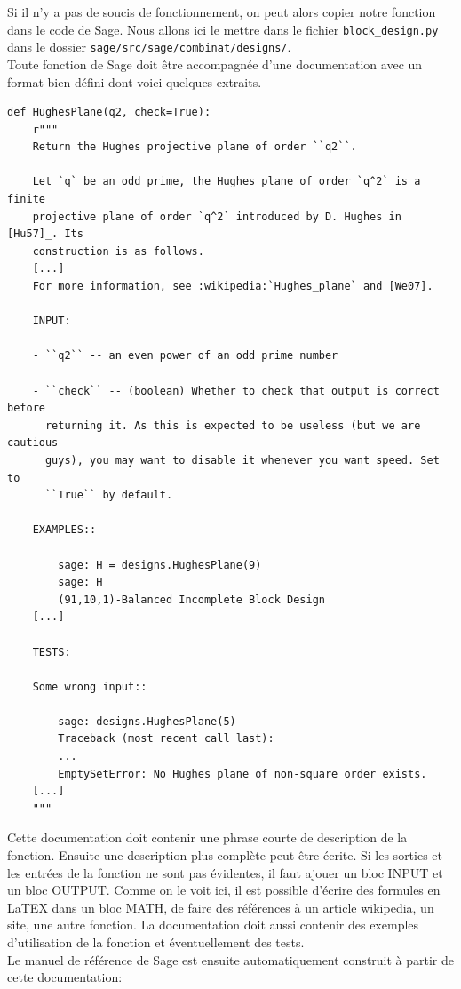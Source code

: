\documentclass[a4paper]{article}
\begin{document}
\medskip
Si il n'y a pas de soucis de fonctionnement, on peut alors copier notre fonction dans le code de Sage. Nous allons ici le mettre dans le fichier \texttt{block\_design.py} dans le dossier \texttt{sage/src/sage/combinat/designs/}.\medskip\\
Toute fonction de Sage doit être accompagnée d'une documentation avec un format bien défini dont voici quelques extraits.\\
\begin{lstlisting}
def HughesPlane(q2, check=True):
    r"""
    Return the Hughes projective plane of order ``q2``.

    Let `q` be an odd prime, the Hughes plane of order `q^2` is a finite
    projective plane of order `q^2` introduced by D. Hughes in [Hu57]_. Its
    construction is as follows.
    [...]
    For more information, see :wikipedia:`Hughes_plane` and [We07].

    INPUT:

    - ``q2`` -- an even power of an odd prime number

    - ``check`` -- (boolean) Whether to check that output is correct before
      returning it. As this is expected to be useless (but we are cautious
      guys), you may want to disable it whenever you want speed. Set to
      ``True`` by default.

    EXAMPLES::

        sage: H = designs.HughesPlane(9)
        sage: H
        (91,10,1)-Balanced Incomplete Block Design
    [...]
        
    TESTS:

    Some wrong input::

        sage: designs.HughesPlane(5)
        Traceback (most recent call last):
        ...
        EmptySetError: No Hughes plane of non-square order exists.
    [...]
    """
\end{lstlisting}
\newpage
Cette documentation doit contenir une phrase courte de description de la fonction. Ensuite une description plus complète peut être écrite. Si les sorties et les entrées de la fonction ne sont pas évidentes, il faut ajouer un bloc INPUT et un bloc OUTPUT. Comme on le voit ici, il est possible d'écrire des formules en LaTEX dans un bloc MATH, de faire des références à un article wikipedia, un site, une autre fonction. La documentation doit aussi contenir des exemples d'utilisation de la fonction et éventuellement des tests.\smallskip\\
Le manuel de référence de Sage est ensuite automatiquement construit à partir de cette documentation:
\end{document}

